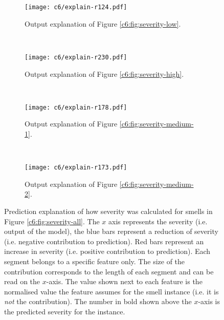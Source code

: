\begin{figure*}
    \centering
    \begin{subfigure}[b]{\linewidth}
        \centering
        \texttt{[image: c6/explain-r124.pdf]}
        \caption{Output explanation of Figure \ref{c6:fig:severity-low}.}
        \label{c6:fig:explain-low}
    \end{subfigure}\\
    \begin{subfigure}[b]{\linewidth}
        \centering
        \texttt{[image: c6/explain-r230.pdf]}
        \caption{Output explanation of Figure \ref{c6:fig:severity-high}.}
        \label{c6:fig:explain-high}
    \end{subfigure}
    \\
    \begin{subfigure}[b]{\linewidth}
        \centering
        \texttt{[image: c6/explain-r178.pdf]}
        \caption{Output explanation of Figure \ref{c6:fig:severity-medium-1}.}
        \label{c6:fig:explain-medium-1}
    \end{subfigure}
    \\
    \begin{subfigure}[b]{\linewidth}
        \centering
        \texttt{[image: c6/explain-r173.pdf]}
        \caption{Output explanation of Figure \ref{c6:fig:severity-medium-2}.}
        \label{c6:fig:explain-medium-2}
    \end{subfigure}
       \caption{Prediction explanation of how severity was calculated for smells in Figure \ref{c6:fig:severity-all}. The $x$ axis represents the severity (i.e. output of the model), the blue bars represent a reduction of severity (i.e. negative contribution to prediction). Red bars represent an increase in severity (i.e. positive contribution to prediction). Each segment belongs to a specific feature only. The size of the contribution corresponds to the length of each segment and can be read on the $x$-axis. The value shown next to each feature is the normalised value the feature assumes for the smell instance (i.e. it is \emph{not} the contribution). The number in bold shown above the $x$-axis is the predicted severity for the instance.}
       \label{c6:fig:explain-all}
\end{figure*}

